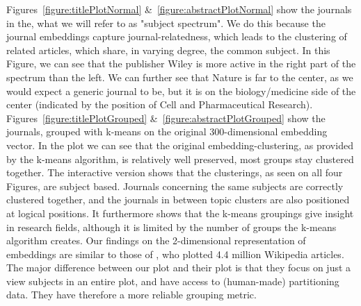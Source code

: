 \documentclass[../../Thesis.tex]{subfiles}
\begin{document}
Figures~\ref{figure:titlePlotNormal} \&~\ref{figure:abstractPlotNormal} show the journals in the, what we will refer to as "subject spectrum". We do this because the journal embeddings capture journal-relatedness, which leads to the clustering of related articles, which share, in varying degree, the common subject. In this Figure, we can see that the publisher Wiley is more active in the right part of the spectrum than the left. We can further see that Nature is far to the center, as we would expect a generic journal to be, but it is on the biology/medicine side of the center (indicated by the position of Cell and Pharmaceutical Research).\\
Figures~\ref{figure:titlePlotGrouped} \&~\ref{figure:abstractPlotGrouped} show the journals, grouped with k-means on the original 300-dimensional embedding vector. In the plot we can see that the original embedding-clustering, as provided by the k-means algorithm, is relatively well preserved, most groups stay clustered together. 
The interactive version shows that the clusterings, as seen on all four Figures, are subject based. Journals concerning the same subjects are correctly clustered together, and the journals in between topic clusters are also positioned at logical positions. It furthermore shows that the k-means groupings give insight in research fields, although it is limited by the number of groups the k-means algorithm creates. Our findings on the 2-dimensional representation of embeddings are similar to those of \citet{dai2015document}, who plotted 4.4 million Wikipedia articles. The major difference between our plot and their plot is that they focus on just a view subjects in an entire plot, and have access to (human-made) partitioning data. They have therefore a more reliable grouping metric.
\end{document}

